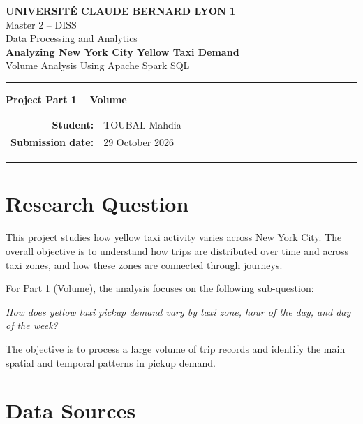 \documentclass[10pt,a4paper]{article}
\begin{document}

\begin{center}
    {\large\bfseries UNIVERSITÉ CLAUDE BERNARD LYON 1}\\[3pt]
    {\normalsize Master 2 -- DISS}\\[3pt]
    {\normalsize Data Processing and Analytics}\\[12pt]

    {\LARGE\bfseries\color{navy}
    Analyzing New York City Yellow Taxi Demand}\\[5pt]

    {\large Volume Analysis Using Apache Spark SQL}\\[10pt]

    \hrule
    \vspace{8pt}

    {\normalsize\textbf{Project Part 1 -- Volume}}\\[8pt]

    \begin{tabular}{rl}
        \textbf{Student:} & TOUBAL Mahdia\\
        \textbf{Submission date:} & 29 October 2026\\
    \end{tabular}

    \vspace{8pt}
    \hrule
\end{center}

\section{Research Question}

This project studies how yellow taxi activity varies across New York City.
The overall objective is to understand how trips are distributed over time
and across taxi zones, and how these zones are connected through journeys.

For Part 1 (Volume), the analysis focuses on the following sub-question:

\textit{How does yellow taxi pickup demand vary by taxi zone, hour of the
day, and day of the week?}

The objective is to process a large volume of trip records and identify
the main spatial and temporal patterns in pickup demand.

\section{Data Sources}
\end{document}
